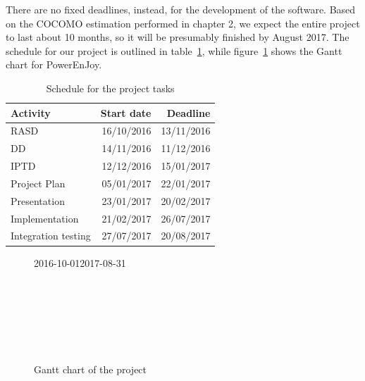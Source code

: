 There are no fixed deadlines, instead, for the development of the software. Based on the COCOMO estimation performed in chapter 2, we expect the entire project to last about 10 months, so it will be presumably finished by August 2017. The schedule for our project is outlined in table~\ref{tab:schedule}, while figure~\ref{fig:gantt} shows the Gantt chart for PowerEnJoy.

\begin{table}[H]
	\centering
	\begin{tabular}{|l|r|r|}
		\hline
		\textbf{Activity} & \textbf{Start date} & \textbf{Deadline} \\
		\hline
		RASD & 16/10/2016 & 13/11/2016 \\
		DD & 14/11/2016 & 11/12/2016 \\
		IPTD & 12/12/2016 & 15/01/2017 \\
		Project Plan & 05/01/2017 & 22/01/2017 \\
		Presentation & 23/01/2017 & 20/02/2017 \\
		Implementation & 21/02/2017 & 26/07/2017 \\
		Integration testing & 27/07/2017 & 20/08/2017 \\
		\hline	
	\end{tabular}

	\caption{Schedule for the project tasks}
	\label{tab:schedule}
\end{table}

\begin{figure}[H]
	\centering
	\begin{sideways}	
		\begin{ganttchart}[
			vgrid={*{6}{draw=none},dotted},
			time slot format=isodate,
			x unit=0.6mm,
			today=2017-01-22,
			today rule/.style= {ultra thick},
			today label=Today,
			link bulge=6, link tolerance=5,
			bar inline label node/.style={font=\scriptsize},
			inline
			]{2016-10-01}{2017-08-31}
			 \\
			 \\
			 \\
			 \\
			 \\
			 \\
			 \\
		\end{ganttchart}
	\end{sideways}

	\caption{Gantt chart of the project}
	\label{fig:gantt}
\end{figure}